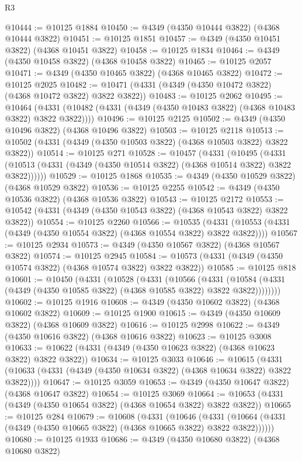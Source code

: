 \begin{lexlean}{R3}
\begin{coremodule}
@10444 := @10125 @1884
@10450 := @4349 (@4350 @10444 @3822) (@4368 @10444 @3822)
@10451 := @10125 @1851
@10457 := @4349 (@4350 @10451 @3822) (@4368 @10451 @3822)
@10458 := @10125 @1834
@10464 := @4349 (@4350 @10458 @3822) (@4368 @10458 @3822)
@10465 := @10125 @2057
@10471 := @4349 (@4350 @10465 @3822) (@4368 @10465 @3822)
@10472 := @10125 @2025
@10482 := @10471 (@4331 (@4349 (@4350 @10472 @3822) (@4368 @10472 @3822) @3822 @3822))
@10483 := @10125 @2062
@10495 := @10464
    (@4331 (@10482 (@4331 (@4349 (@4350 @10483 @3822) (@4368 @10483 @3822) @3822 @3822))))
@10496 := @10125 @2125
@10502 := @4349 (@4350 @10496 @3822) (@4368 @10496 @3822)
@10503 := @10125 @2118
@10513 := @10502 (@4331 (@4349 (@4350 @10503 @3822) (@4368 @10503 @3822) @3822 @3822))
@10514 := @10125 @271
@10528 := @10457
    (@4331
      (@10495
        (@4331 (@10513 (@4331 (@4349 (@4350 @10514 @3822) (@4368 @10514 @3822) @3822 @3822))))))
@10529 := @10125 @1868
@10535 := @4349 (@4350 @10529 @3822) (@4368 @10529 @3822)
@10536 := @10125 @2255
@10542 := @4349 (@4350 @10536 @3822) (@4368 @10536 @3822)
@10543 := @10125 @2172
@10553 := @10542 (@4331 (@4349 (@4350 @10543 @3822) (@4368 @10543 @3822) @3822 @3822))
@10554 := @10125 @2260
@10566 := @10535
    (@4331 (@10553 (@4331 (@4349 (@4350 @10554 @3822) (@4368 @10554 @3822) @3822 @3822))))
@10567 := @10125 @2934
@10573 := @4349 (@4350 @10567 @3822) (@4368 @10567 @3822)
@10574 := @10125 @2945
@10584 := @10573 (@4331 (@4349 (@4350 @10574 @3822) (@4368 @10574 @3822) @3822 @3822))
@10585 := @10125 @818
@10601 := @10450
    (@4331
      (@10528
        (@4331
          (@10566
            (@4331
              (@10584 (@4331 (@4349 (@4350 @10585 @3822) (@4368 @10585 @3822) @3822 @3822))))))))
@10602 := @10125 @1916
@10608 := @4349 (@4350 @10602 @3822) (@4368 @10602 @3822)
@10609 := @10125 @1900
@10615 := @4349 (@4350 @10609 @3822) (@4368 @10609 @3822)
@10616 := @10125 @2998
@10622 := @4349 (@4350 @10616 @3822) (@4368 @10616 @3822)
@10623 := @10125 @3008
@10633 := @10622 (@4331 (@4349 (@4350 @10623 @3822) (@4368 @10623 @3822) @3822 @3822))
@10634 := @10125 @3033
@10646 := @10615
    (@4331 (@10633 (@4331 (@4349 (@4350 @10634 @3822) (@4368 @10634 @3822) @3822 @3822))))
@10647 := @10125 @3059
@10653 := @4349 (@4350 @10647 @3822) (@4368 @10647 @3822)
@10654 := @10125 @3069
@10664 := @10653 (@4331 (@4349 (@4350 @10654 @3822) (@4368 @10654 @3822) @3822 @3822))
@10665 := @10125 @284
@10679 := @10608
    (@4331
      (@10646
        (@4331 (@10664 (@4331 (@4349 (@4350 @10665 @3822) (@4368 @10665 @3822) @3822 @3822))))))
@10680 := @10125 @1933
@10686 := @4349 (@4350 @10680 @3822) (@4368 @10680 @3822)

\end{coremodule}
\end{lexlean}
